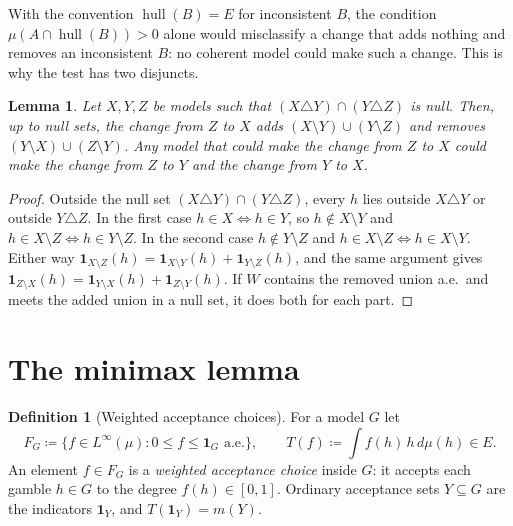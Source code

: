 \documentclass[11pt]{article}
\newcommand{\one}{\mathbf{1}}
\newcommand{\hull}{\operatorname{hull}}
\theoremstyle{plain}
\newtheorem{lemma}[theorem]{Lemma}
\theoremstyle{definition}
\newtheorem{definition}[theorem]{Definition}
\theoremstyle{remark}
\begin{document}
With the convention $\hull(B)=E$ for inconsistent $B$, the condition $\mu(A\cap\hull(B))>0$
alone would misclassify a change that adds nothing and removes an inconsistent $B$: no
coherent model could make such a change. This is why the test has two disjuncts.

\begin{lemma}\label{lem:join}
Let $X,Y,Z$ be models such that $(X\triangle Y)\cap(Y\triangle Z)$ is null. Then, up to null
sets, the change from $Z$ to $X$ adds $(X\setminus Y)\cup(Y\setminus Z)$ and removes
$(Y\setminus X)\cup(Z\setminus Y)$. Any model that could make the change from $Z$ to $X$
could make the change from $Z$ to $Y$ and the change from $Y$ to $X$.
\end{lemma}

\begin{proof}
Outside the null set $(X\triangle Y)\cap(Y\triangle Z)$, every $h$ lies outside $X\triangle Y$
or outside $Y\triangle Z$. In the first case $h\in X\iff h\in Y$, so $h\notin X\setminus Y$
and $h\in X\setminus Z\iff h\in Y\setminus Z$. In the second case $h\notin Y\setminus Z$ and
$h\in X\setminus Z\iff h\in X\setminus Y$. Either way $\one_{X\setminus Z}(h)=\one_{X\setminus
Y}(h)+\one_{Y\setminus Z}(h)$, and the same argument gives $\one_{Z\setminus X}(h)=\one_{Y
\setminus X}(h)+\one_{Z\setminus Y}(h)$. If $W$ contains the removed union a.e.\ and meets
the added union in a null set, it does both for each part.
\end{proof}

\section{The minimax lemma}\label{sec:minimax}

\begin{definition}[Weighted acceptance choices]\label{def:weighted-choices}
For a model $G$ let
\[
  F_G\coloneqq\{f\in L^\infty(\mu):0\le f\le\one_G\text{ a.e.}\},\qquad
  T(f)\coloneqq\int f(h)\,h\,d\mu(h)\in E .
\]
An element $f\in F_G$ is a \emph{weighted acceptance choice} inside $G$: it accepts each
gamble $h\in G$ to the degree $f(h)\in[0,1]$. Ordinary acceptance sets $Y\subseteq G$ are
the indicators $\one_Y$, and $T(\one_Y)=m(Y)$.
\end{definition}
\end{document}
